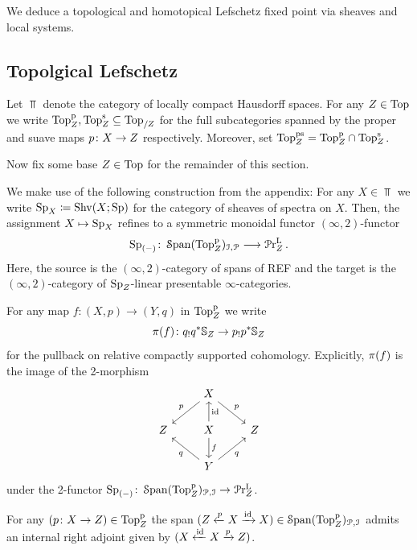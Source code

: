 We deduce a topological and homotopical Lefschetz fixed point 
via sheaves and local systems.

\subsection{Topolgical Lefschetz}

\begin{defn}
    Let $\Top$ denote the category of locally compact Hausdorff
    spaces. For any $Z \in \mathrm{Top}$ we write 
    $\mathrm{Top}^{\mathrm{p}}_{Z}, \mathrm{Top}^{\mathrm{s}}_{Z} \subseteq \mathrm{Top}_{/Z}$ 
    for the full subcategories spanned by the proper and suave maps $p\colon X\to Z$ respectively. Moreover,
    set $\mathrm{Top}^{\mathrm{ps}}_{Z}= \mathrm{Top}^{\mathrm{p}}_{Z} \cap \mathrm{Top}^{\mathrm{s}}_{Z}$. 
\end{defn}

Now fix some base $Z\in \mathrm{Top}$ for the remainder of this section. 

We make use of the following construction from the appendix:
For any $X\in \Top$ we write $\operatorname{Sp}_{X}\coloneq \operatorname{Shv}(X;\operatorname{Sp})$ for the 
category of sheaves of spectra on $X$. Then, the assignment 
$X\mapsto \operatorname{Sp}_{X}$ refines to a symmetric monoidal functor $(\infty,2)$-functor
\[ \operatorname{Sp}_{(-)}\colon \operatorname{\mathcal S\mathrm{pan}}({\mathrm{Top}^{\mathrm{p}}_{Z}})_{\mathcal{I},\mathcal{P}}\longrightarrow \mathcal{P}\mathrm{r}^{\mathrm{L}}_{Z}\,.\]
Here, the source is the $(\infty,2)$-category of spans of REF and the
target is the $(\infty,2)$-category of $\operatorname{Sp}_{Z}$-linear presentable
$\infty$-categories. 

\begin{notation}
For any map $f\colon (X,p)\to (Y,q)$ in $\mathrm{Top}^{\mathrm{p}}_{Z}$ we write 
\[ \pi(f)\colon q_!q^*\mathbb{S}_{Z}\to p_!p^*\mathbb{S}_{Z} \]
for the pullback on relative compactly supported cohomology. 
Explicitly, $\pi(f)$ is the image of the 2-morphism 
\[
\begin{tikzcd}
	& X & \\
	\base & X & \base \\
	& Y
	\arrow["p"', from=1-2, to=2-1]
	\arrow["p", from=1-2, to=2-3]
	\arrow["\id"', from=2-2, to=1-2]
	\arrow["f", from=2-2, to=3-2]
	\arrow["q", from=3-2, to=2-1]
	\arrow["q"', from=3-2, to=2-3]
\end{tikzcd}
\]
under the 2-functor $\operatorname{Sp}_{(-)}\colon \operatorname{\mathcal S\mathrm{pan}}({\mathrm{Top}^{\mathrm{p}}_{Z}})_{\mathcal{P},\mathcal{I}} \to \mathcal{P}\mathrm{r}^{\mathrm{L}}_{Z}$.
\end{notation}

\begin{lem}\label{lem: proper internal right adj}
    For any $(p\colon X\to Z)\in \mathrm{Top}^{\mathrm{p}}_{Z}$ the span 
    $(Z \xleftarrow{p} X \xrightarrow{\operatorname{id}} X) \in \operatorname{\mathcal S\mathrm{pan}}({\mathrm{Top}^{\mathrm{p}}_{Z}})_{\mathcal{P},\mathcal{I}}$ admits an internal
    right adjoint given by $(X \xleftarrow{\operatorname{id}} X \xrightarrow{p} Z)$.
\end{lem}


